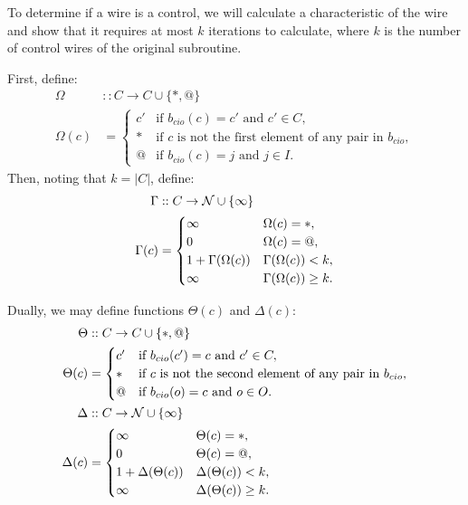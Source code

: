 To determine if a wire is a control, we will calculate a characteristic of the
wire and show that it requires at most $k$ iterations to calculate, where
$k$ is the number of control wires of the original subroutine.

First, define:
\begin{align*}
  \Omega &:: C \to C \cup \{*,@\}\\
  \Omega(c) &=
    \begin{cases}
      c'&\text{if }b_{cio}(c) = c'\text{ and }c'\in C,\\
      *&\text{if $c$ is not the first element of any pair in }b_{cio},\\
      @&\text{if }b_{cio}(c) = j\text{ and }j\in I.
    \end{cases}
\end{align*}
Then, noting that $k = |C|$, define:
\begin{align*}
  \Gamma &:: C \to \mathcal{N} \cup \{\infty\}\\
  \Gamma(c) &=
  \begin{cases}
    \infty & \Omega(c) = *,\\
    0 & \Omega(c) = @,\\
    1 + \Gamma(\Omega(c)) & \Gamma(\Omega(c)) < k,\\
    \infty & \Gamma(\Omega(c)) \ge k.
  \end{cases}
\end{align*}

Dually, we may define functions  $\Theta(c)$ and $\Delta(c)$:
\begin{align*}
\Theta &:: C \to C \cup \{*,@\}\\
\Theta(c) &=
  \begin{cases}
    c'&\text{if }b_{cio}(c') = c\text{ and }c'\in C,\\
    *&\text{if $c$ is not the second element of any pair in }b_{cio},\\
    @&\text{if }b_{cio}(o) = c\text{ and }o\in O.
  \end{cases}\\
  \Delta &:: C \to \mathcal{N} \cup \{\infty\}\\
  \Delta(c) &=
  \begin{cases}
    \infty & \Theta(c) = *,\\
    0 & \Theta(c) = @,\\
    1 + \Delta(\Theta(c)) & \Delta(\Theta(c)) < k,\\
    \infty & \Delta(\Theta(c)) \ge k.
  \end{cases}
\end{align*}

